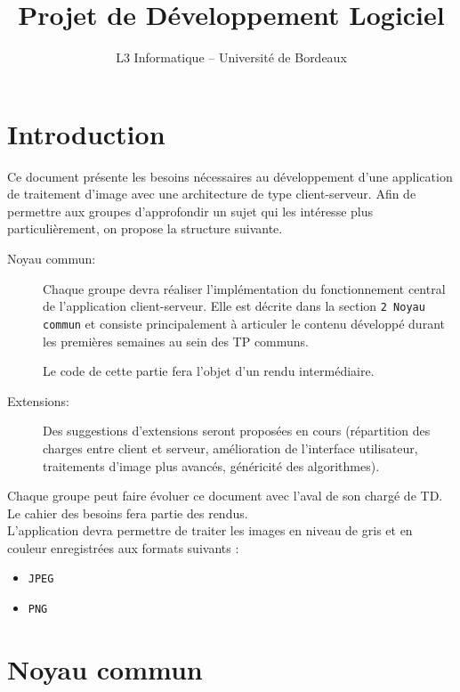\documentclass[a4paper,12pt]{article}
\title{\sffamily \textbf{Projet de Développement Logiciel}}
\author{L3 Informatique -- Université de Bordeaux}
\date{}
\newcounter{besoin}
\begin{document}
\maketitle


\section{Introduction}

Ce document présente les besoins nécessaires au développement d'une application
de traitement d'image avec une architecture de type client-serveur.
Afin de permettre aux groupes d'approfondir un sujet qui les intéresse plus
particulièrement, on propose la structure suivante.

\begin{description}
\item[Noyau commun:] Chaque groupe devra réaliser l'implémentation du fonctionnement central de l'application client-serveur. Elle est décrite dans la section \verb!2 Noyau commun! et consiste principalement à articuler le contenu développé durant les premières semaines au sein des TP communs.

 Le code de cette partie fera l'objet d'un rendu intermédiaire.
  
\item [Extensions: ] Des suggestions d'extensions seront proposées en cours (répartition des charges entre client et serveur, amélioration de l'interface utilisateur, traitements d'image plus avancés,  généricité des algorithmes).
  
\end{description}


Chaque groupe peut faire évoluer ce document avec l'aval de son chargé de TD. Le cahier des besoins fera partie des rendus.\\


L'application devra permettre de traiter les images en niveau de gris et en
couleur enregistrées aux formats suivants :

\begin{itemize}
\item \verb!JPEG!
\item \verb!PNG!
\end{itemize}



\section{\label{sec:kernel}Noyau commun}
\end{document}
